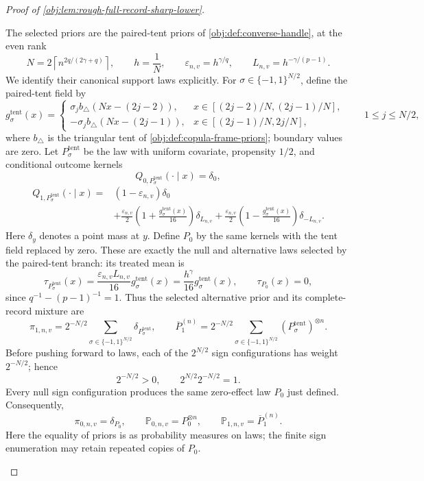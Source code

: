 \begin{proof}[Proof of \cref{obj:lem:rough-full-record-sharp-lower}]
\begin{enumerate}
The selected priors are the paired-tent priors of
\cref{obj:def:converse-handle}, at the even rank
\[
N=2\left\lceil n^{2q/(2\gamma+q)}\right\rceil,
\qquad h=\frac1N,
\qquad \varepsilon_{n,v}=h^{\gamma/q},
\qquad L_{n,v}=h^{-\gamma/(p-1)}.
\]
We identify their canonical support laws explicitly. For
\(\sigma\in\{-1,1\}^{N/2}\), define the paired-tent field by
\[
g^{\mathrm{tent}}_\sigma(x)=
\begin{cases}
\sigma_j b_\triangle(Nx-(2j-2)),
&x\in[(2j-2)/N,(2j-1)/N],\\
-\sigma_j b_\triangle(Nx-(2j-1)),
&x\in[(2j-1)/N,2j/N],
\end{cases}
\qquad 1\le j\le N/2,
\]
where \(b_\triangle\) is the triangular tent of
\cref{obj:def:copula-frame-priors}; boundary values are zero.
Let \(P^{\mathrm{tent}}_\sigma\) be the law with uniform covariate,
propensity \(1/2\), and conditional outcome kernels
\[
Q_{0,P^{\mathrm{tent}}_\sigma}(\cdot\mid x)=\delta_0,
\]
\[
\begin{aligned}
Q_{1,P^{\mathrm{tent}}_\sigma}(\cdot\mid x)
={}&(1-\varepsilon_{n,v})\delta_0\\
&+\frac{\varepsilon_{n,v}}2
\left(1+\frac{g^{\mathrm{tent}}_\sigma(x)}{16}\right)\delta_{L_{n,v}}
+\frac{\varepsilon_{n,v}}2
\left(1-\frac{g^{\mathrm{tent}}_\sigma(x)}{16}\right)\delta_{-L_{n,v}}.
\end{aligned}
\]
Here \(\delta_y\) denotes a point mass at \(y\). Define \(P_0\) by the same kernels with the tent field replaced by zero. These are exactly the null and alternative laws selected by the paired-tent branch: its treated mean is
\[
\tau_{P^{\mathrm{tent}}_\sigma}(x)
=\frac{\varepsilon_{n,v}L_{n,v}}{16}g^{\mathrm{tent}}_\sigma(x)
=\frac{h^\gamma}{16}g^{\mathrm{tent}}_\sigma(x),
\qquad \tau_{P_0}(x)=0,
\]
since \(q^{-1}-(p-1)^{-1}=1\). Thus the selected alternative prior and its complete-record mixture are
\[
\pi_{1,n,v}
=2^{-N/2}\sum_{\sigma\in\{-1,1\}^{N/2}}
\delta_{P^{\mathrm{tent}}_\sigma},
\qquad
\overline P_1^{(n)}
=2^{-N/2}\sum_{\sigma\in\{-1,1\}^{N/2}}
(P^{\mathrm{tent}}_\sigma)^{\otimes n}.
\]
Before pushing forward to laws, each of the \(2^{N/2}\) sign configurations has weight \(2^{-N/2}\); hence
\[
2^{-N/2}>0,
\qquad
2^{N/2}2^{-N/2}=1.
\]
Every null sign configuration produces the same zero-effect law \(P_0\) just defined. Consequently,
\[
\pi_{0,n,v}=\delta_{P_0},
\qquad
\mathbb P_{0,n,v}=P_0^{\otimes n},
\qquad
\mathbb P_{1,n,v}=\overline P_1^{(n)}.
\]
Here the equality of priors is as probability measures on laws; the finite sign enumeration may retain repeated copies of \(P_0\).


\end{enumerate}
\end{proof}
